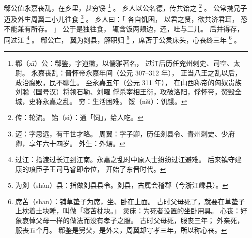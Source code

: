 
\switchcolumn*[\section{}]

郗公值永嘉丧乱，在乡里，甚穷馁%
\footnote{%
    郗（xī）公：郗鉴，字道徽，以儒雅著名，
                过江后历任兖州刺史、司空、太尉。
    永嘉丧乱：晋怀帝永嘉年间（公元 307--312 年），
              正当八王之乱以后，政治腐败，民不聊生。
              至永嘉五年（公元 311 年），
              在山西称帝的匈奴贵族刘聪（国号汉）将领石勒、刘曜
              俘杀宰相王衍，攻破洛阳，俘怀帝，焚毁全城，史称永嘉之乱。
    穷：生活困难。
    馁（něi）：饥饿。
}%
。
乡人以公名德，传共饴之%
\footnote{%
    传：轮流。
    饴（sì）：通「饲」，给人吃。
}%
。
公常携兄子迈及外生周翼二小儿往食%
\footnote{%
    迈：字思远，有干世才略。
    周翼：字子卿，历任剡县令、青州刺史、少府卿，享年六十四岁。
    外生：外甥。
}%
。
乡人曰：「
    各自饥困，
    以君之贤，欲共济君耳，
    恐不能兼有所存。
」
公于是独往食，
辄含饭两颊边，还，吐与二儿。
后并得存，同过江%
\footnote{%
    过江：指渡过长江到江南。永嘉之乱时中原人士纷纷过江避难。
          后来镇守建康的琅臣子王司马睿即帝位，
          开始了东晋时代。
}%
。
郗公亡，
翼为剡县，解职归%
\footnote{%
    为剡（shàn）县：指做剡县县令。剡县，古属会稽郡（今浙江嵊县）。
}%
，席苫于公灵床头，心丧终三年%
\footnote{%
    席苫（shān）：铺草垫子为席，坐、卧在上面。
                  古时父母死了，就要在草垫子上枕着土块睡，叫做「寝苫枕块。」
    灵床：为死者设置的坐卧用具。
    心丧：好象哀悼父母一样的做法而没有孝子之服。
          古时父母死，服丧三年；
          外亲死，服丧五个月。
          郗鉴是舅父，是外亲，周翼却守孝三年，所以称心丧。
}%
。

\switchcolumn



